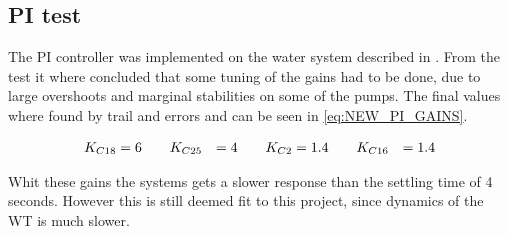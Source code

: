 \subsection*{PI test}

The PI controller was implemented on the water system described in . From the test it where concluded that some tuning of the gains had to be done, due to large overshoots and marginal stabilities on some of the pumps. The final values where found by trail and errors and can be seen in \eqref{eq:NEW_PI_GAINS}. 

\begin{equation}
\centering
	\begin{split}
	K_{C18} &= 6 \hspace{20pt} K_{C25} &= 4 \hspace{20pt} K_{C2} &= 1.4 \hspace{20pt} K_{C16} &= 1.4
	\end{split}
	\label{eq:NEW_PI_GAINS}
\end{equation}

Whit these gains the systems gets a slower response than the settling time of 4 seconds. However this is still deemed fit to this project, since dynamics of the WT is much slower.